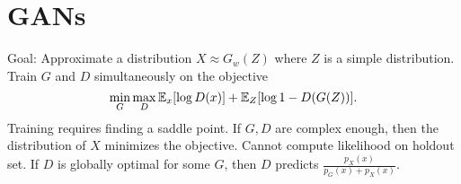 \section*{GANs}
Goal: Approximate a distribution $X\approx G_w(Z)$ where $Z$
is a simple distribution.
Train $G$ and $D$ simultaneously 
on the objective
$$\min_G\max_D\mathbb{E}_x[\log D(x)] +\mathbb{E}_Z[\log1-D(G(Z))].$$
Training requires finding a saddle point. If 
$G, D$ are complex enough, then the distribution of $X$
minimizes the objective. Cannot compute likelihood on holdout set.
If $D$ is globally optimal for some $G$, then $D$ predicts
$\frac{p_X(x)}{p_G(x)+p_X(x)}$.